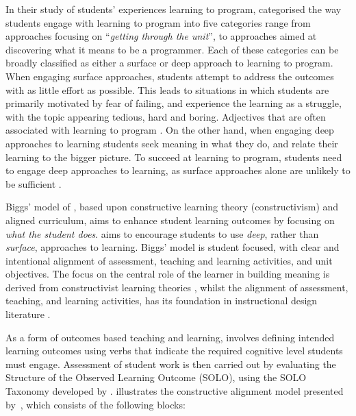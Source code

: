  In their study of students' experiences learning to program, \citet{Bruce:2003} categorised the way students engage with learning to program into five categories range from approaches focusing on ``\emph{getting through the unit}'', to approaches aimed at discovering what it means to be a programmer. Each of these categories can be broadly classified as either a surface or deep approach to learning \cite{Marton:1976a,Ramsden:1992} to program. When engaging surface approaches, students attempt to address the outcomes with as little effort as possible. This leads to situations in which students are primarily motivated by fear of failing, and experience the learning as a struggle, with the topic appearing tedious, hard and boring. Adjectives that are often associated with learning to program \cite{McGettrick:2005}. On the other hand, when engaging deep approaches to learning students seek meaning in what they do, and relate their learning to the bigger picture. To succeed at learning to program, students need to engage deep approaches to learning, as surface approaches alone are unlikely to be sufficient \cite{Bruce:2003}.

Biggs' model of \CA \cite{Biggs:1996c,Biggs:2007}, based upon constructive learning theory (constructivism) and aligned curriculum, aims to enhance student learning outcomes by focusing on \emph{what the student does}. \CA aims to encourage students to use \emph{deep}, rather than \emph{surface}, approaches to learning. Biggs' model is student focused, with clear and intentional alignment of assessment, teaching and learning activities, and unit objectives. The focus on the central role of the learner in building meaning is derived from constructivist learning theories , whilst the alignment of assessment, teaching, and learning activities, has its foundation in instructional design literature \cite{Cohen:1987} .

As a form of outcomes based teaching and learning, \CA involves defining intended learning outcomes using verbs that indicate the required cognitive level students must engage. Assessment of student work is then carried out by evaluating the Structure of the Observed Learning Outcome (SOLO), using the SOLO Taxonomy developed by \citet{Biggs:1982}.  illustrates the constructive alignment model presented by~\citet{Houghton:2004}, which consists of the following blocks:

